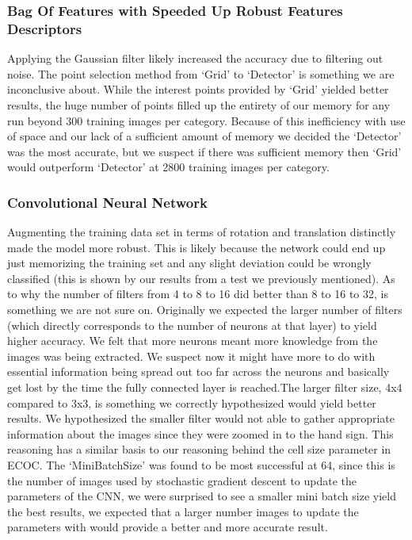 \documentclass[conference]{IEEEtran}
\begin{document}
\subsubsection{Bag Of Features with Speeded Up Robust Features Descriptors}
Applying the Gaussian filter likely increased the accuracy due to filtering out noise. The point selection method from ‘Grid’ to ‘Detector’ is something we are inconclusive about. While the interest points provided by ‘Grid’ yielded better results, the huge number of points filled up the entirety of our memory for any run beyond 300 training images per category. Because of this inefficiency with use of space and our lack of a sufficient amount of memory we decided the ‘Detector’ was the most accurate, but we suspect if there was sufficient memory then ‘Grid’ would outperform ‘Detector’ at 2800 training images per category.
\subsubsection{Convolutional Neural Network}
Augmenting the training data set in terms of rotation and translation distinctly made the model more robust. This is likely because the network could end up just memorizing the training set and any slight deviation could be wrongly classified (this is shown by our results from a test we previously mentioned). As to why the number of filters from 4 to 8 to 16 did better than 8 to 16 to 32, is something we are not sure on. Originally we expected the larger number of filters (which directly corresponds to the number of neurons at that layer) to yield higher accuracy. We felt that more neurons meant more knowledge from the images was being extracted. We suspect now it might have more to do with essential information being spread out too far across the neurons and basically get lost by the time the fully connected layer is reached.The larger filter size, 4x4 compared to 3x3, is something we correctly hypothesized would yield better results. We hypothesized the smaller filter would not able to gather appropriate information about the images since they were zoomed in to the hand sign. This reasoning has a similar basis to our reasoning behind the cell size parameter in ECOC. The ‘MiniBatchSize’ was found to be most successful at 64, since this is the number of images used by stochastic gradient descent to update the parameters of the CNN, we were surprised to see a smaller mini batch size yield the best results, we expected that a larger number images to update the parameters with would provide a better and more accurate result.
\end{document}
